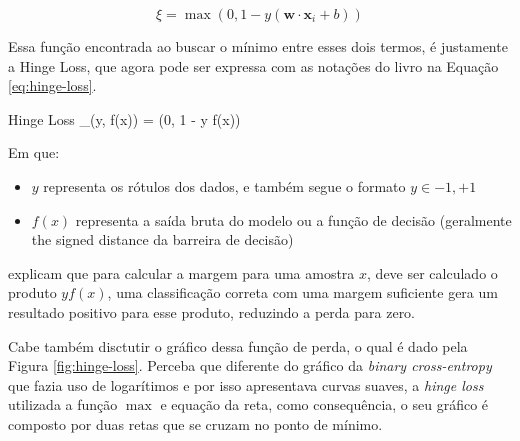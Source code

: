 \[
    \xi = \max (0, 1 - y(\textbf{w} \cdot \textbf{x}_i + b))
\]

Essa função encontrada ao buscar o mínimo entre esses dois termos, é justamente a Hinge Loss, que agora pode ser expressa com as notações do livro na Equação \ref{eq:hinge-loss}.

\begin{equacaodestaque}{Hinge Loss}
    \Loss_{}(y, f(x)) = \max(0, 1 - y \cdot f(x))
    \label{eq:hinge-loss}
\end{equacaodestaque}

Em que:

\begin{itemize}
    \item $y$ representa os rótulos dos dados, e também segue o formato $y \in {-1, +1}$
    \item $f(x)$ representa a saída bruta do modelo ou a função de decisão (geralmente the signed distance da barreira de decisão)
\end{itemize}

\textcite{LossesArticle} explicam que para calcular a margem para uma amostra $x$, deve ser calculado o produto $yf(x)$, uma classificação correta com uma margem suficiente gera um resultado positivo para esse produto, reduzindo a perda para zero.

Cabe também disctutir o gráfico dessa função de perda, o qual é dado pela Figura \ref{fig:hinge-loss}. Perceba que diferente do gráfico da \textit{binary cross-entropy} que fazia uso de logarítimos e por isso apresentava curvas suaves, a \textit{hinge loss} utilizada a função $\max$ e equação da reta, como consequência, o seu gráfico é composto por duas retas que se cruzam no ponto de mínimo.

